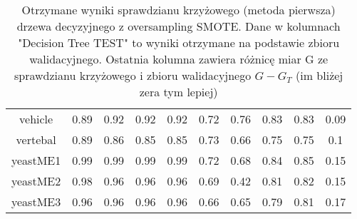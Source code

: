 \begin{table}[H]
\begin{center}
{\begin{tabular}{|c|c|c|c|c|c|c|c|c|c|}
				vehicle&0.89&0.92&0.92&0.92&0.72&0.76&0.83&0.83&0.09\\%
				vertebal&0.89&0.86&0.85&0.85&0.73&0.66&0.75&0.75&0.1\\%
				yeastME1&0.99&0.99&0.99&0.99&0.72&0.68&0.84&0.85&0.15\\%
				yeastME2&0.98&0.96&0.96&0.96&0.69&0.42&0.81&0.82&0.15\\%
				yeastME3&0.96&0.96&0.96&0.96&0.66&0.65&0.79&0.81&0.17\\%
				\hline%
			\end{tabular}}%
			\caption{Otrzymane wyniki sprawdzianu krzyżowego (metoda pierwsza) drzewa decyzyjnego z oversampling SMOTE. Dane w kolumnach "Decision Tree TEST" to wyniki otrzymane na podstawie zbioru walidacyjnego. Ostatnia kolumna zawiera różnicę  miar G ze sprawdzianu krzyżowego i zbioru walidacyjnego $G-G_T$ (im bliżej zera tym lepiej)}
			\label{CVoversampling1}
		\end{center}
\end{table}


